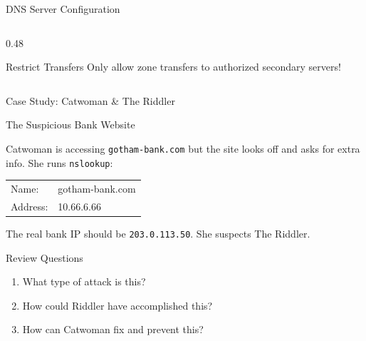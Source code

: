 \documentclass[aspectratio=169, 11pt]{beamer}
\newenvironment{casestudy}[1]{%
    \begin{alertblock}{#1}
}{\end{alertblock}}
\begin{document}
\begin{frame}{DNS Server Configuration}
\begin{columns}[T]
\begin{column}{0.48\textwidth}
            \vspace{0.2em}
            \begin{exampleblock}{Restrict Transfers}
                \small
                Only allow zone transfers to authorized secondary servers!
            \end{exampleblock}
        \end{column}
    \end{columns}
\end{frame}

\begin{frame}{Case Study: Catwoman \& The Riddler}
    \begin{casestudy}{The Suspicious Bank Website}
        \small
        Catwoman is accessing \texttt{gotham-bank.com} but the site looks off and asks for extra info. She runs \texttt{nslookup}:
        
        \vspace{0.2em}
        \ttfamily\footnotesize
        \begin{tabular}{l l}
            Name: & gotham-bank.com \\
            Address: & \textcolor{alertred}{10.66.6.66} \\
        \end{tabular}
        
        \vspace{0.2em}
        \normalfont\small
        The real bank IP should be \texttt{203.0.113.50}. She suspects The Riddler.
    \end{casestudy}
    
    \begin{block}{Review Questions}
        \small
        \begin{enumerate}\setlength{\itemsep}{1pt}
            \item What type of attack is this?
            \item How could Riddler have accomplished this?
            \item How can Catwoman fix and prevent this?
        \end{enumerate}
    \end{block}
\end{frame}
\end{document}
